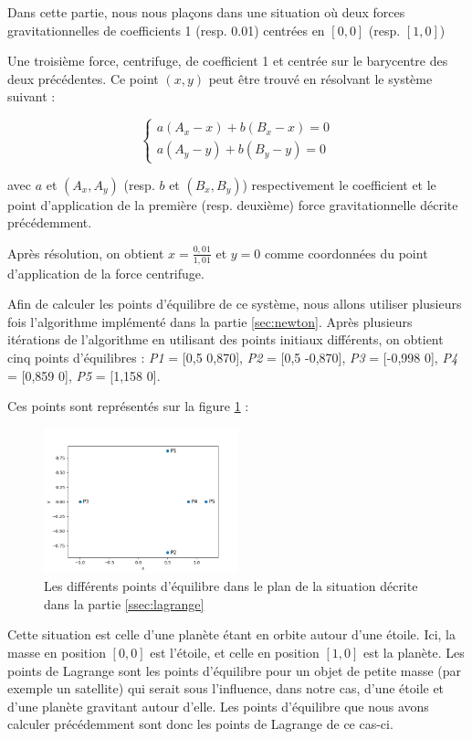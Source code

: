 Dans cette partie, nous nous plaçons dans une situation où deux forces gravitationnelles de coefficients 1 (resp. 0.01) centrées en $[0, 0]$ (resp. $[1, 0]$)

Une troisième force, centrifuge, de coefficient 1 et centrée sur le barycentre des deux précédentes. Ce point $(x, y)$ peut être trouvé en résolvant le système suivant :

$$
\begin{cases}
  a(A_x - x) + b(B_x - x) = 0 \\
  a(A_y - y) + b(B_y - y) = 0
\end{cases}
$$

avec $a$ et $(A_x, A_y)$ (resp. $b$ et $(B_x, B_y)$) respectivement le coefficient et le point d'application de la première (resp. deuxième) force gravitationnelle décrite précédemment.

Après résolution, on obtient $x = \frac{0,01}{1,01}$ et $y = 0$ comme coordonnées du point d'application de la force centrifuge.

\bigskip

Afin de calculer les points d'équilibre de ce système, nous allons utiliser plusieurs fois l'algorithme implémenté dans la partie \ref{sec:newton}. Après plusieurs itérations de l'algorithme en utilisant des points initiaux différents, on obtient cinq points d'équilibres : \emph{P1} = [0,5  0,870], \emph{P2} = [0,5  -0,870], \emph{P3} = [-0,998  0], \emph{P4} = [0,859  0], \emph{P5} = [1,158  0].

Ces points sont représentés sur la figure \ref{fig:equi_pts} :

\begin{figure}[H]
  \centering
  \includegraphics[width=0.5\textwidth]{img/equilibrium_points.png}
  \caption{Les différents points d'équilibre dans le plan de la situation décrite dans la partie \ref{ssec:lagrange}}
  \label{fig:equi_pts}
\end{figure}

\bigskip

Cette situation est celle d'une planète étant en orbite autour d'une étoile. Ici, la masse en position $[0, 0]$ est l'étoile, et celle en position $[1, 0]$ est la planète. Les points de Lagrange sont les points d'équilibre pour un objet de petite masse (par exemple un satellite) qui serait sous l'influence, dans notre cas, d'une étoile et d'une planète gravitant autour d'elle. Les points d'équilibre que nous avons calculer précédemment sont donc les points de Lagrange de ce cas-ci.

